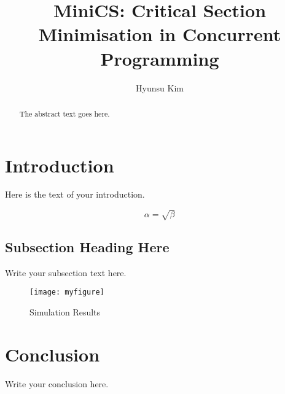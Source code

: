 \documentclass[journal]{IEEEtran}
\begin{document}
\title{MiniCS: Critical Section Minimisation in Concurrent Programming}
\author{Hyunsu Kim}

\maketitle

\begin{abstract}
The abstract text goes here.
\end{abstract}

\section{Introduction}
Here is the text of your introduction.

\begin{equation}
    \label{simple_equation}
    \alpha = \sqrt{ \beta }
\end{equation}

\subsection{Subsection Heading Here}
Write your subsection text here.

\begin{figure}
    \centering
    \texttt{[image: myfigure]}
    \caption{Simulation Results}
    \label{simulationfigure}
\end{figure}

\section{Conclusion}
Write your conclusion here.
\end{document}

